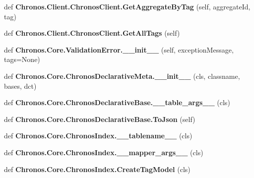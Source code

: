\begin{DoxyCompactItemize}
\item 
def {\bfseries Chronos.\+Client.\+Chronos\+Client.\+Get\+Aggregate\+By\+Tag} (self, aggregate\+Id, tag)\hypertarget{group__Chronos_ga0f0e8aea065c83bb0698d479714c1bb8}{}\label{group__Chronos_ga0f0e8aea065c83bb0698d479714c1bb8}

\item 
def {\bfseries Chronos.\+Client.\+Chronos\+Client.\+Get\+All\+Tags} (self)\hypertarget{group__Chronos_gaf5a31ba2eb905b4c6f2f40555d10319c}{}\label{group__Chronos_gaf5a31ba2eb905b4c6f2f40555d10319c}

\item 
def {\bfseries Chronos.\+Core.\+Validation\+Error.\+\_\+\+\_\+init\+\_\+\+\_\+} (self, exception\+Message, tags=None)\hypertarget{group__Chronos_ga51489479a9f63744dfb65723c3d184a4}{}\label{group__Chronos_ga51489479a9f63744dfb65723c3d184a4}

\item 
def {\bfseries Chronos.\+Core.\+Chronos\+Declarative\+Meta.\+\_\+\+\_\+init\+\_\+\+\_\+} (cls, classname, bases, dct)\hypertarget{group__Chronos_gaf6d55af3c930c2c9cab313719d8f9a26}{}\label{group__Chronos_gaf6d55af3c930c2c9cab313719d8f9a26}

\item 
def {\bfseries Chronos.\+Core.\+Chronos\+Declarative\+Base.\+\_\+\+\_\+table\+\_\+args\+\_\+\+\_\+} (cls)\hypertarget{group__Chronos_gacf47cea3a68ee6144602157e63643ca2}{}\label{group__Chronos_gacf47cea3a68ee6144602157e63643ca2}

\item 
def {\bfseries Chronos.\+Core.\+Chronos\+Declarative\+Base.\+To\+Json} (self)\hypertarget{group__Chronos_gaf158cc5ac1b69b4c1f2d6617e1035fc6}{}\label{group__Chronos_gaf158cc5ac1b69b4c1f2d6617e1035fc6}

\item 
def {\bfseries Chronos.\+Core.\+Chronos\+Index.\+\_\+\+\_\+tablename\+\_\+\+\_\+} (cls)\hypertarget{group__Chronos_ga67fca408b9d68829ed4311f20628262a}{}\label{group__Chronos_ga67fca408b9d68829ed4311f20628262a}

\item 
def {\bfseries Chronos.\+Core.\+Chronos\+Index.\+\_\+\+\_\+mapper\+\_\+args\+\_\+\+\_\+} (cls)\hypertarget{group__Chronos_ga19bb2b31676d09d5c90a6d9a62033fc9}{}\label{group__Chronos_ga19bb2b31676d09d5c90a6d9a62033fc9}

\item 
def {\bfseries Chronos.\+Core.\+Chronos\+Index.\+Create\+Tag\+Model} (cls)\hypertarget{group__Chronos_ga3d22956dc355d15d46aecceeab862651}{}\label{group__Chronos_ga3d22956dc355d15d46aecceeab862651}


\end{DoxyCompactItemize}
